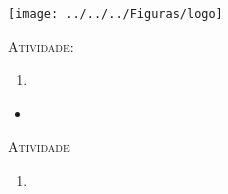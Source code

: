 \documentclass[10 pt,usenames,dvipsnames, oneside]{article}
\begin{document}
\begin{center}
  \begin{minipage}[l]{3cm}
\texttt{[image: ../../../Figuras/logo]}       
\end{minipage}\hfill
\begin{minipage}[r]{.8\textwidth}
 {\Large \scshape Atividade: }  
\end{minipage}
\end{center}
\vspace{.2cm}

\ifdefined\prof
\begin{goals}
\begin{enumerate}
\item
\end{enumerate}

\tcblower

\begin{itemize}
\item 
\end{itemize}
\end{goals}

\bigskip
\begin{center}
{\large \scshape Atividade}
\end{center}
\fi


\ifdefined\prof
\begin{solucao}

\begin{enumerate}
\item 
\end{enumerate}

\end{solucao}
\fi
\end{document}
